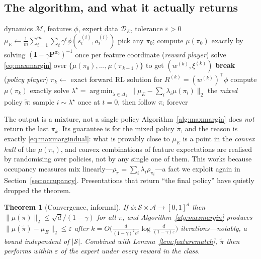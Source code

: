 \documentclass[11pt]{article}
\theoremstyle{plain}
\newtheorem{theorem}{Theorem}[section]
\theoremstyle{definition}
\theoremstyle{remark}
\renewcommand{\S}{\mathcal{S}}
\newcommand{\A}{\mathcal{A}}
\DeclareMathOperator*{\argmin}{arg\,min}
\begin{document}
\subsection{The algorithm, and what it actually returns}

\begin{algorithm}[H]
\caption{Max-Margin / Apprenticeship Learning (Abbeel \& Ng, 2004)}
\begin{algorithmic}[1]
\Require dynamics $\mathcal{M}$, features $\phi$, expert data
$\mathcal{D}_E$, tolerance $\varepsilon>0$
\State $\mu_E \gets \frac1m\sum_{i=1}^m\sum_t \gamma^t \phi(s_t^{(i)},a_t^{(i)})$
\State pick any $\pi_0$; compute $\mu(\pi_0)$ exactly by solving
$(\mathbf{I}-\gamma\mathbf{P}^{\pi_0})^{-1}$ once per feature coordinate
  \State (\emph{reward player}) solve \eqref{eq:maxmargin} over
  $\{\mu(\pi_0),\ldots,\mu(\pi_{k-1})\}$ to get $(w^{(k)},\xi^{(k)})$
   \textbf{break} \EndIf
  \State (\emph{policy player}) $\pi_k \gets$ exact forward RL solution for
  $R^{(k)} = (w^{(k)})^\top\phi$
  \State compute $\mu(\pi_k)$ exactly
\EndFor
\State solve $\lambda^\star = \argmin_{\lambda\in\Delta_k} \|\mu_E -
\sum_i \lambda_i \mu(\pi_i)\|_2$
\State \Return the \emph{mixed} policy $\tilde\pi$: sample $i\sim
\lambda^\star$ once at $t=0$, then follow $\pi_i$ forever
\end{algorithmic}
\label{alg:maxmargin}
\end{algorithm}

\begin{redbox}{The output is a mixture, not a single policy}
Algorithm~\ref{alg:maxmargin} does \emph{not} return the last $\pi_k$. Its
guarantee is for the mixed policy $\tilde\pi$, and the reason is exactly
\eqref{eq:maxmargindual}: what is provably close to $\mu_E$ is a point in
the \emph{convex hull} of the $\mu(\pi_i)$, and convex combinations of
feature expectations are realised by randomising over policies, not by any
single one of them. This works because occupancy measures mix
linearly---$\rho_{\tilde\pi} = \sum_i \lambda_i \rho_{\pi_i}$---a fact we
exploit again in Section~\ref{sec:occupancy}. Presentations that return
``the final policy'' have quietly dropped the theorem.
\end{redbox}

\begin{theorem}[Convergence, informal]
If $\phi:\S\times\A\to[0,1]^d$ then $\|\mu(\pi)\|_2 \le
\sqrt{d}/(1-\gamma)$ for all $\pi$, and Algorithm~\ref{alg:maxmargin}
produces $\|\mu(\tilde\pi)-\mu_E\|_2 \le \varepsilon$ after
$k=O\big(\frac{d}{(1-\gamma)^2\varepsilon^2}\log\frac{d}{(1-\gamma)\varepsilon}\big)$
iterations---notably, a bound independent of $|\S|$. Combined with
Lemma~\ref{lem:featurematch}, $\tilde\pi$ then performs within
$\varepsilon$ of the expert under every reward in the class.
\end{theorem}
\end{document}
